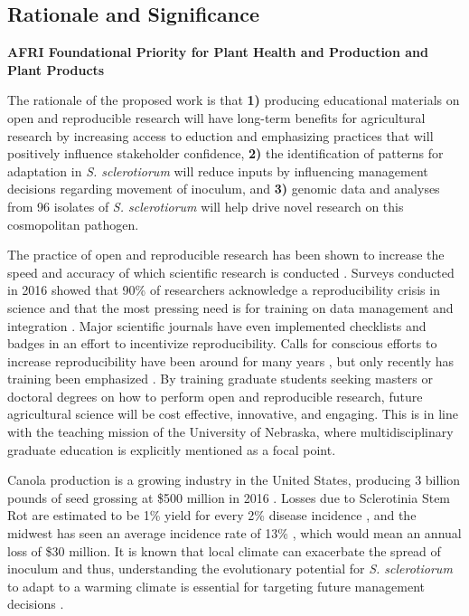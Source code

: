\documentclass[12pt,letterpaper]{article}
\begin{document}
\subsection{Rationale and Significance}


\noindent
\textbf{AFRI Foundational Priority for Plant Health and Production and Plant Products}

The rationale of the proposed work is that 
\textbf{1)} producing educational materials on open and reproducible research will have long-term benefits for agricultural research by increasing access to eduction and emphasizing practices that will positively influence stakeholder confidence, 
\textbf{2)} the identification of patterns for adaptation in \textit{S. sclerotiorum} will reduce inputs by influencing management decisions regarding movement of inoculum, and 
\textbf{3)} genomic data and analyses from 96 isolates of \textit{S. sclerotiorum} will help drive novel research on this cosmopolitan pathogen. 

The practice of open and reproducible research has been shown to increase the speed and accuracy of which scientific research is conducted \citep{stewart-lowndes2017path, wilson2016good}.
Surveys conducted in 2016 showed that 90\% of researchers acknowledge a reproducibility crisis in science \citep{baker2016scientists} and that the most pressing need is for training on data management and integration \citep{barone2017unmet}. 
Major scientific journals have even implemented checklists \citep{nature2017announcement} and badges \citep{kidwell2016badges} in an effort to incentivize reproducibility.
Calls for conscious efforts to increase reproducibility have been around for many years \citep{buckheit1995wavelab, peng2011reproducible}, but only recently has training been emphasized \citep{schmidt2016stepping, stewart-lowndes2017path, wilson2016good}. 
By training graduate students seeking masters or doctoral degrees on how to perform open and reproducible research, future agricultural science will be cost effective, innovative, and engaging. 
This is in line with the teaching mission of the University of Nebraska, where multidisciplinary graduate education is explicitly mentioned as a focal point.

Canola production is a growing industry in the United States, producing 3 billion pounds of seed grossing at \$500 million in 2016 \citep{usda2017production, usda2017values}. Losses due to Sclerotinia Stem Rot are estimated to be 1\% yield for every 2\% disease incidence \citep{delrio2007impact}, and the midwest has seen an average incidence rate of 13\% \citep{markell2009sclerotinia}, which would mean an annual loss of \$30 million. 
It is known that local climate can exacerbate the spread of inoculum and thus, understanding the evolutionary potential for \textit{S. sclerotiorum} to adapt to a warming climate is essential for targeting future management decisions \citep{attanayake2014inferring,shea2000integrated,billiard2012sex}.
\end{document}
